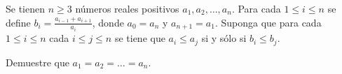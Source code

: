 \begin{problem}
    
    Se tienen $n\geq 3$ números reales positivos $a_1,a_2,\dots,a_n$. Para cada $1\leq i\leq n$ se define $b_i=\frac{a_{i-1}+a_{i+1}}{a_i}$, donde $a_0=a_n$ y $a_{n+1}=a_1$. Suponga que para cada $1\leq i\leq n$ cada $i\leq j\leq n$ se tiene que $a_i\leq a_j$ si y sólo si $b_i\leq b_j$.  \newline 

Demuestre que $a_1=a_2=\dots =a_n$.
    
    \label{23EGMO1}
\end{problem}